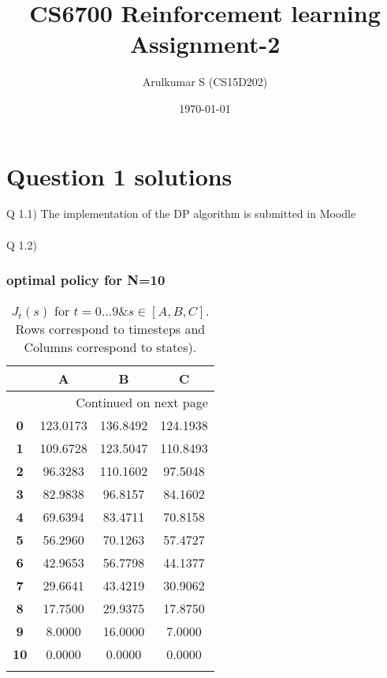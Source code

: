 \documentclass{article}
\title{CS6700 Reinforcement learning\\ Assignment-2}
\author{Arulkumar S (CS15D202)}
\date{\today}
\begin{document}
\maketitle

\section*{Question 1 solutions}

Q 1.1) The implementation of the DP algorithm is submitted in Moodle
\\\\
Q 1.2) 
\subsubsection*{optimal policy for N=10}

\begin{longtable}{|c|c|c|c|}
\toprule
{} &         A &         B &         C \\
\midrule
\endhead
\midrule
\multicolumn{4}{r}{{Continued on next page}} \\
\midrule
\endfoot

\bottomrule
\endlastfoot
\textbf{0 } &  123.0173 &  136.8492 &  124.1938 \\\hline
\textbf{1 } &  109.6728 &  123.5047 &  110.8493 \\\hline
\textbf{2 } &   96.3283 &  110.1602 &   97.5048 \\\hline
\textbf{3 } &   82.9838 &   96.8157 &   84.1602 \\\hline
\textbf{4 } &   69.6394 &   83.4711 &   70.8158 \\\hline
\textbf{5 } &   56.2960 &   70.1263 &   57.4727 \\\hline
\textbf{6 } &   42.9653 &   56.7798 &   44.1377 \\\hline
\textbf{7 } &   29.6641 &   43.4219 &   30.9062 \\\hline
\textbf{8 } &   17.7500 &   29.9375 &   17.8750 \\\hline
\textbf{9 } &    8.0000 &   16.0000 &    7.0000 \\\hline
\textbf{10} &    0.0000 &    0.0000 &    0.0000 \\\hline
\caption{$J_t(s)$ for $t=0 \dots 9 \& s \in [A, B, C]$. Rows correspond to timesteps and Columns correspond to states).}
\end{longtable}
\end{document}
